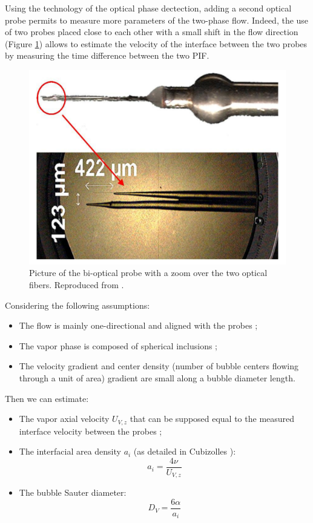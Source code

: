 Using the technology of the optical phase dectection, adding a second optical probe permits to measure more parameters of the two-phase flow. Indeed, the use of two probes placed close to each other with a small shift in the flow direction (Figure \ref{fig:optical_probe}) allows to estimate the velocity of the interface between the two probes by measuring the time difference between the two PIF.


\begin{figure}[!h]
\centering
\includegraphics[width=0.65\linewidth]{img/DEBORA/optical_probe.png}
\caption{Picture of the bi-optical probe with a zoom over the two optical fibers. Reproduced from \cite{gueguen_contribution_2013}.}
\label{fig:optical_probe}
\end{figure}

\npar

Considering the following assumptions:

\begin{itemize}
\item The flow is mainly one-directional and aligned with the probes ;
\item The vapor phase is composed of spherical inclusions ;
\item The velocity gradient and center density (number of bubble centers flowing through a unit of area) gradient are small along a bubble diameter length.
\end{itemize}

Then we can estimate: 

\begin{itemize}
\item The vapor axial velocity $U_{V,z}$ that can be supposed equal to the measured interface velocity between the probes ;
\item The interfacial area density $a_{i}$ (as detailed in Cubizolles \cite{cubizolles_etude_1996}):
\begin{equation}
a_{i} = \frac{4 \nu }{U_{V,z}}
\label{eq:interfacial_area_debora}
\end{equation}
\item The bubble Sauter diameter:
\begin{equation}
D_{V} = \frac{6 \alpha }{a_{i}}
\label{eq:dV_debora}
\end{equation}
\end{itemize}


